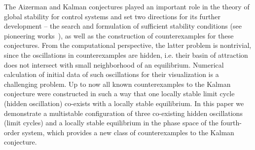 \documentclass{ifacconf}
\theoremstyle{plain}
\begin{document}
The Aizerman and Kalman conjectures played an important role in
the theory of global stability for control systems
and set two directions for its further development --
the search and formulation of sufficient stability conditions
(see pioneering works~\citep{Popov-1961,Kal63,GeligLY-1978}),
as well as the construction of counterexamples for these conjectures.
From the computational perspective, the latter problem is nontrivial,
since the oscillations in counterexamples are hidden,
i.e. their basin of attraction does not intersect with small neighborhood of an equilibrium.
Numerical calculation of initial data of such oscillations for their visualization
is a challenging problem.
Up to now all known counterexamples to the Kalman conjecture were constructed in such a way
that one locally stable limit cycle (hidden oscillation) co-exists with a locally stable equilibrium.
In this paper we demonstrate a multistable configuration of three co-existing hidden oscillations (limit cycles)
and a locally stable equilibrium
in the phase space of the fourth-order system, which provides a new class of counterexamples
to the Kalman conjecture.
\end{document}
